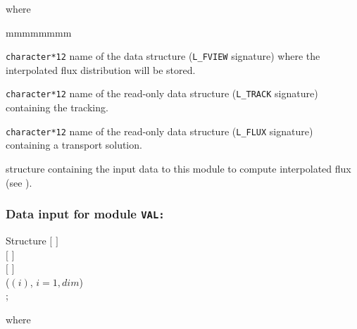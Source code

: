 \noindent
where
\begin{ListeDeDescription}{mmmmmmmm}

\item[\dusa{IFLU}] {\tt character*12} name of the  data
structure ({\tt L\_FVIEW} signature) where the interpolated flux distribution will be stored.

\item[\dusa{TRKNAM}] {\tt character*12} name of the read-only  data
structure ({\tt L\_TRACK} signature) containing the tracking. 

\item[\dusa{FLUNAM}] {\tt character*12} name of the read-only  data
structure ({\tt L\_FLUX} signature) containing a transport solution.

\item[\dstr{descval}] structure containing the input data to this module to compute interpolated flux
(see ).

\end{ListeDeDescription}

\subsubsection{Data input for module {\tt VAL:}}\label{sect:descval}

\begin{DataStructure}{Structure }
$[$   $]$ \\
$[$   $]$ \\
$[$   $]$ \\
  ($(i)$, $i=1,dim$) \\
;
\end{DataStructure}

\noindent where

